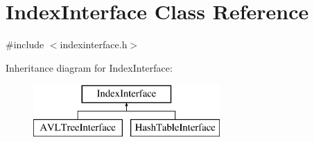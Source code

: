 \hypertarget{class_index_interface}{}\section{Index\+Interface Class Reference}
\label{class_index_interface}


{\ttfamily \#include $<$indexinterface.\+h$>$}

Inheritance diagram for Index\+Interface\+:\begin{figure}[H]
\begin{center}
\leavevmode
\includegraphics[height=2.000000cm]{class_index_interface}
\end{center}
\end{figure}
